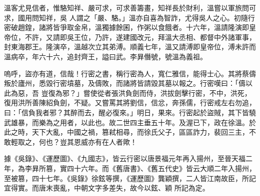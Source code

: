 \begin{pinyinscope}
 溫客尤見信者，惟駱知祥、嚴可求，可求善籌畫，知祥長於財利，溫嘗以軍旅問可求，國用問知祥，吳
 人謂之「嚴、駱。」溫亦自喜為智詐，尤得吳人之心。初隨行密破趙鍠，諸將皆爭取金帛，溫獨據餘囷，作粥以食餓者。十六年，溫請隆演即皇帝位，不許，又請即吳王位，乃許，遂建國改元，拜溫大丞相、都督中外諸軍事，封東海郡王。隆演卒，溫越次立其弟溥。順義七年，溫又請溥即皇帝位，溥未許而溫病卒，年六十六，追封齊王，謚曰武。李昪僭號，號溫為義祖。



 嗚呼，盜亦有道，信哉！行密之書，稱行密為人，寬仁雅信，能得士心。其將蔡儔叛於廬州，悉毀行密墳墓，及儔敗，而諸將皆請毀其墓以報之。行密嘆曰：「儔以此為惡，吾
 豈復為邪？」嘗使從者張洪負劍而侍，洪拔劍擊行密，不中，洪死，復用洪所善陳紹負劍，不疑。又嘗罵其將劉信，信忿，奔孫儒，行密戒左右勿追，曰：「信負我者邪？其醉而去，醒必復來。」明日，果來。行密起於盜賊，其下皆驍武雄暴，而樂為之用者，以此也。故二世四主垂五十年。及渥已下，政在徐溫。於此之時，天下大亂，中國之禍，篡弒相尋，而徐氏父子，區區詐力，裴回三主，不敢輕取之，何也？豈其恩威亦有在人者歟！



 據《吳錄》、《運歷圖》、《九國志》，皆云行密以唐景福元年再入揚州，至晉天福二年，為李昪所篡，實四十六年。而《舊唐書》、《舊五代史》皆云大順二年入揚州，至被篡，四十七年。《吳錄》徐鉉等撰，《運歷圖》龔穎撰，二人皆江南故臣，所記宜得實。而唐末喪亂，中朝文字多差失，故今以鉉、穎
 所記為定。






\end{pinyinscope}